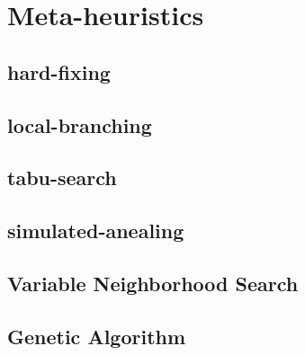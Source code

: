 \chapter{Meta-heuristics}

\section{hard-fixing}

\section{local-branching}

\section{tabu-search}

\section{simulated-anealing}

\section{Variable Neighborhood Search}

\section{Genetic Algorithm}
